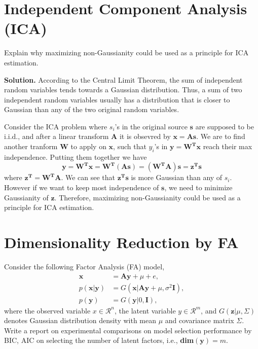 \documentclass[12pt,a4paper,UTF8,fntef]{article}
\begin{document}
\section{Independent Component Analysis (ICA)}
Explain why maximizing non-Gaussianity could be used as a principle for ICA estimation.

\textbf{Solution.} According to the Central Limit Theorem, the sum of independent random variables tends towards a Gaussian distribution. Thus, a sum of two independent random variables usually has a distribution that is closer to Gaussian than any of the two original random variables. 

Consider the ICA problem where $s_i$'s in the original source $\mathbf{s}$ are supposed  to be i.i.d., and after a linear transform $\mathbf{A}$ it is obsevred by $\mathbf{x}=\mathbf{As}$. We are to find another tranform $\mathbf{W}$ to apply on $\mathbf{x}$, such that $y_i$'s in $\mathbf{y}=\mathbf{W^Tx}$ reach their max independence. Putting them together we have
$$
\mathbf{y}=\mathbf{W^Tx}=\mathbf{W^T(As)}=\mathbf{(W^TA)s}=\mathbf{z^Ts}
$$
where $\mathbf{z^T}=\mathbf{W^TA}$. We can see that $\mathbf{z^Ts}$ is more Gaussian than any of $s_i$. However if we want to keep most independence of $\mathbf{s}$, we need to minimize Gaussianity of $\mathbf{z}$. Therefore, maximizing non-Gaussianity could be used as a principle for ICA estimation.
\section{Dimensionality Reduction by FA}
Consider the following Factor Analysis (FA) model,
\begin{align}
	\mathbf{x}&=\mathbf{Ay}+\mu+e, \\
	p(\mathbf{x}|\mathbf{y})&=G(\mathbf{x}|\mathbf{Ay}+\mu,\sigma^2\mathbf{I}), \\
	p(\mathbf{y})&=G(\mathbf{y}|0,\mathbf{I}),
\end{align}
where the observed variable $x \in \mathcal{R}^n$, the latent variable $y \in \mathcal{R}^m$, and $G(\mathbf{z}|\mu,\Sigma)$ denotes Gaussian distribution density with mean $\mu$ and covariance matrix $\Sigma$. Write a report on experimental comparisons on model selection performance by BIC, AIC on selecting the number of latent factors, i.e., \textbf{dim}$(\mathbf{y}) = m$.
\end{document}
